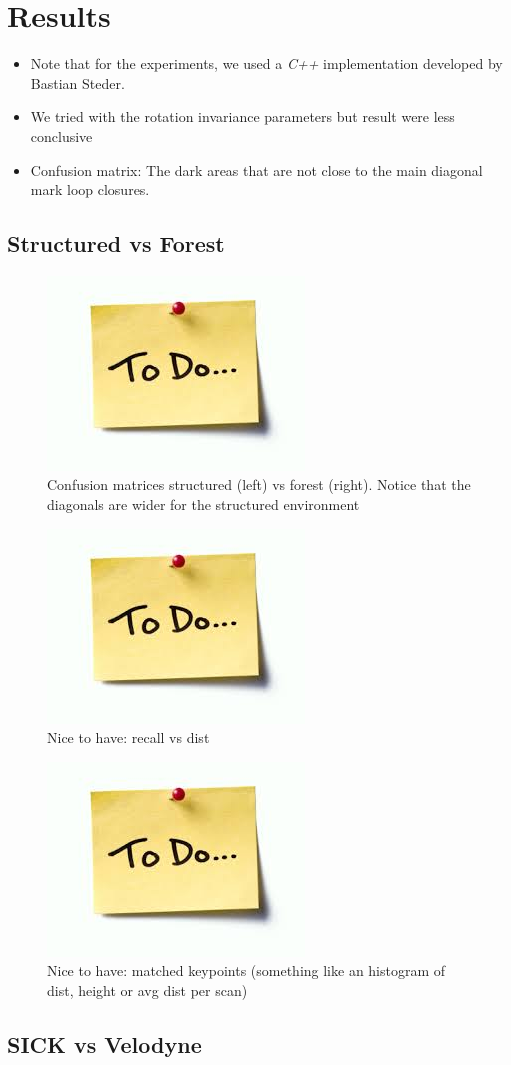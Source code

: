 \section{Results}
\label{sec:chap_slam_results}

\begin{itemize}
    \item Note that for the experiments, we used a \textit{C++} implementation developed by Bastian Steder.
    \item We tried with the rotation invariance parameters but result were less conclusive
    \item Confusion matrix: The dark areas that are not close to the main diagonal mark loop closures.
\end{itemize}

\subsection{Structured vs Forest}
\label{ssec:chap_slam_struct_vs_forest}

\begin{figure}[htpb]
    \centering
    \includegraphics[width=0.2\linewidth]{img/todo.jpg}
    \caption[todo]{Confusion matrices structured (left) vs forest (right). Notice that the diagonals are wider for the structured environment}
    \label{fig:matrices_struct_vs_forest}
\end{figure}

\begin{figure}[htpb]
    \centering
    \includegraphics[width=0.2\linewidth]{img/todo.jpg}
    \caption[todo]{Nice to have: recall vs dist}
    \label{fig:recall_dist}
\end{figure}

\begin{figure}[htpb]
    \centering
    \includegraphics[width=0.2\linewidth]{img/todo.jpg}
    \caption[todo]{Nice to have: matched keypoints (something like an histogram of dist, height or avg dist per scan)}
    \label{fig:match_avg_dist}
\end{figure}

\subsection{SICK vs Velodyne}
\label{ssec:chap_slam_sick_vs_velodyne}
